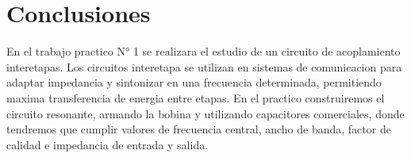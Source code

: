 \section{Conclusiones}

En el trabajo practico N° 1 se realizara el estudio de un circuito de acoplamiento interetapas. Los circuitos interetapa se utilizan en sistemas 
de comunicacion para adaptar impedancia y sintonizar en una frecuencia determinada, permitiendo maxima transferencia de energia entre etapas.
En el practico construiremos el circuito resonante, armando la bobina y utilizando capacitores comerciales, donde tendremos que cumplir valores de frecuencia central, ancho 
de banda, factor de calidad e impedancia de entrada y salida.

